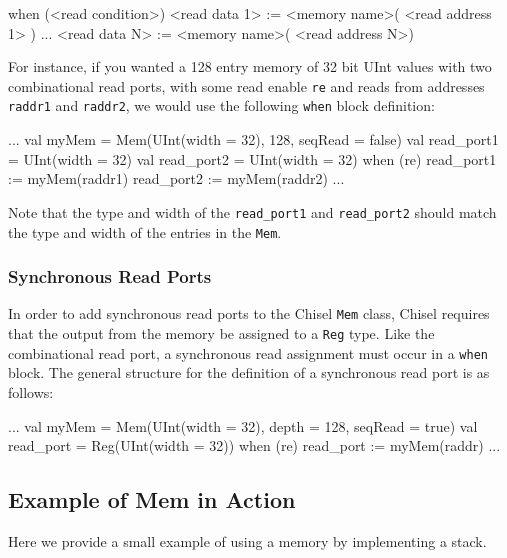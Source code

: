 \begin{scala}
when (<read condition>) {
  <read data 1> := <memory name>( <read address 1> )
  ...
  <read data N> := <memory name>( <read address N>)
}
\end{scala}

For instance, if you wanted a 128 entry memory of 32 bit UInt values with two combinational read ports, with some read enable \verb+re+ and reads from addresses \verb+raddr1+ and \verb+raddr2+, we would use the following \verb+when+ block definition:

\begin{scala}
...
val myMem = 
  Mem(UInt(width = 32), 128, seqRead = false)
val read_port1 = UInt(width = 32)
val read_port2 = UInt(width = 32)
when (re) {
  read_port1 := myMem(raddr1)
  read_port2 := myMem(raddr2)
}
...
\end{scala}

Note that the type and width of the \verb+read_port1+ and \verb+read_port2+ should match the type and width of the entries in the \verb+Mem+.

\subsubsection{Synchronous Read Ports}

In order to add synchronous read ports to the Chisel \verb+Mem+ class, Chisel requires that the output from the memory be assigned to a \verb+Reg+ type. Like the combinational read port, a synchronous read assignment must occur in a \verb+when+ block. The general structure for the definition of a synchronous read port is as follows:

\begin{scala}
...
val myMem = 
  Mem(UInt(width = 32), depth = 128, seqRead = true)
val read_port = Reg(UInt(width = 32))
when (re) {
  read_port := myMem(raddr)
}
...
\end{scala}

\subsection{Example of Mem in Action}


Here we provide a small example of using a memory by implementing a stack.


